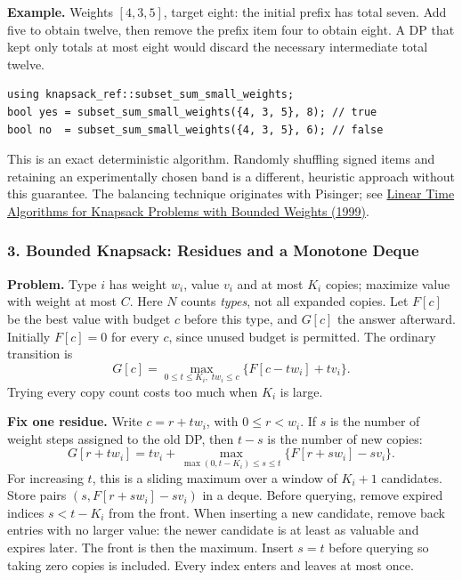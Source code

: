 \textbf{Example.} Weights $[4,3,5]$, target eight: the initial prefix
has total seven. Add five to obtain twelve, then remove the prefix
item four to obtain eight. A DP that kept only totals at most eight
would discard the necessary intermediate total twelve.

\begin{minipage}{\linewidth}
\begin{lstlisting}[style=C++,showstringspaces=false]
using knapsack_ref::subset_sum_small_weights;
bool yes = subset_sum_small_weights({4, 3, 5}, 8); // true
bool no  = subset_sum_small_weights({4, 3, 5}, 6); // false
\end{lstlisting}
\end{minipage}
\par
This is an exact deterministic algorithm. Randomly shuffling signed
items and retaining an experimentally chosen band is a different,
heuristic approach without this guarantee. The balancing technique
originates with Pisinger; see
\href{https://doi.org/10.1006/jagm.1999.1034}{Linear Time Algorithms
for Knapsack Problems with Bounded Weights (1999)}.

\subsubsection{3. Bounded Knapsack: Residues and a Monotone Deque}
\textbf{Problem.} Type $i$ has weight $w_i$, value $v_i$ and at most
$K_i$ copies; maximize value with weight at most $C$.
Here $N$ counts \emph{types}, not all expanded copies.
Let $F[c]$ be the best value with budget $c$ before this type, and
$G[c]$ the answer afterward. Initially $F[c]=0$ for every $c$, since
unused budget is permitted. The ordinary transition is
\[
 G[c]=\max_{0\le t\le K_i,\;tw_i\le c}
       \{F[c-tw_i]+t v_i\}.
\]
Trying every copy count costs too much when $K_i$ is large.

\textbf{Fix one residue.} Write $c=r+t w_i$, with $0\le r<w_i$.
If $s$ is the number of weight steps assigned to the old DP, then
$t-s$ is the number of new copies:
\[
 G[r+t w_i]=t v_i+
 \max_{\max(0,t-K_i)\le s\le t}
       \{F[r+s w_i]-s v_i\}.
\]
For increasing $t$, this is a sliding maximum over a window of
$K_i+1$ candidates. Store pairs $(s,F[r+s w_i]-s v_i)$ in a deque.
Before querying, remove expired indices $s<t-K_i$ from the front.
When inserting a new candidate, remove back entries with no larger
value: the newer candidate is at least as valuable and expires later.
The front is then the maximum. Insert $s=t$ before querying so taking
zero copies is included. Every index enters and leaves at most once.

